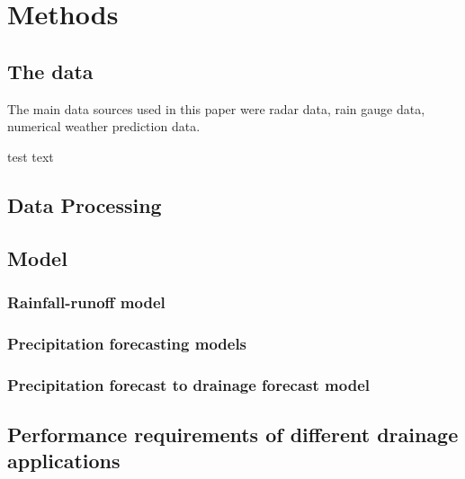 \chapter{Methods} \label{sec:Methods}

\section{The data}

The main data sources used in this paper were radar data, rain gauge data, numerical weather prediction data. 

test text

\section{Data Processing}
\section{Model}
\subsection{Rainfall-runoff model}
\subsection{Precipitation forecasting models}
\subsection{Precipitation forecast to drainage forecast model}
\section{Performance requirements of different drainage applications}
